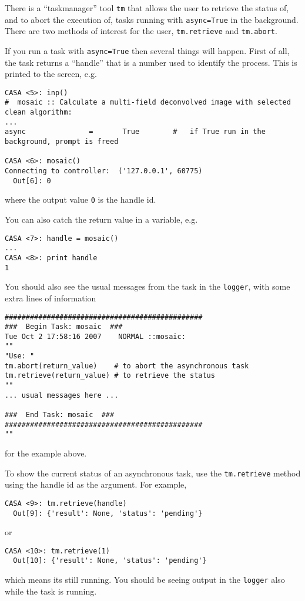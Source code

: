 There is a ``taskmanager'' tool {\tt tm} that allows the user
to retrieve the status of, and to abort the execution of, tasks
running with {\tt async=True} in the background.  There
are two methods of interest for the user, {\tt tm.retrieve} and
{\tt tm.abort}.

If you run a task with {\tt async=True} then several things will
happen.  First of all, the task returns a ``handle'' that is 
a number used to identify the process.  This is printed to the 
screen, e.g. 
\small
\begin{verbatim}
CASA <5>: inp()
#  mosaic :: Calculate a multi-field deconvolved image with selected clean algorithm:
...
async               =       True        #   if True run in the background, prompt is freed

CASA <6>: mosaic()
Connecting to controller:  ('127.0.0.1', 60775)
  Out[6]: 0
\end{verbatim}
\normalsize
where the output value {\tt 0} is the handle id.  

You can also catch the return value in a variable, e.g.
\small
\begin{verbatim}
CASA <7>: handle = mosaic()
...
CASA <8>: print handle
1
\end{verbatim}
\normalsize
You should also see the usual messages from the task in the 
{\tt logger}, with some extra lines of information
\small
\begin{verbatim}
###############################################
###  Begin Task: mosaic  ###
Tue Oct 2 17:58:16 2007    NORMAL ::mosaic:
""
"Use: "
tm.abort(return_value)    # to abort the asynchronous task
tm.retrieve(return_value) # to retrieve the status
""
... usual messages here ...

###  End Task: mosaic  ###
###############################################
""
\end{verbatim}
\normalsize
for the example above.

To show the current status of an asynchronous task, use the
{\tt tm.retrieve} method using the handle id as the argument.
For example,
\small
\begin{verbatim}
CASA <9>: tm.retrieve(handle)
  Out[9]: {'result': None, 'status': 'pending'}
\end{verbatim}
\normalsize
or
\small
\begin{verbatim}
CASA <10>: tm.retrieve(1)
  Out[10]: {'result': None, 'status': 'pending'}
\end{verbatim}
\normalsize
which means its still running.  You should be seeing output in
the {\tt logger} also while the task is running.  

